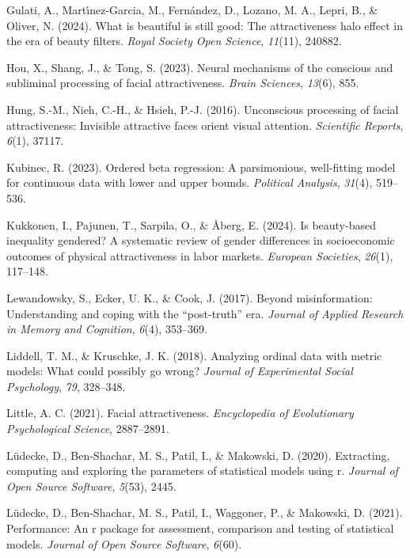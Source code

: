 \documentclass[
  jou,
  floatsintext,
  longtable,
  nolmodern,
  notxfonts,
  notimes,
  colorlinks=true,linkcolor=blue,citecolor=blue,urlcolor=blue]{apa7}
\newlength{\cslhangindent}
\newenvironment{CSLReferences}[2] %
 {\begin{list}{}{%
  \setlength{\itemindent}{0pt}
  \setlength{\leftmargin}{0pt}
  \setlength{\parsep}{0pt}
  \ifodd #1
   \setlength{\leftmargin}{\cslhangindent}
   \setlength{\itemindent}{-1\cslhangindent}
  \fi
  \setlength{\itemsep}{#2\baselineskip}}}
 {\end{list}}
\begin{document}
\begin{CSLReferences}{1}{0}
Gulati, A., Martı́nez-Garcia, M., Fernández, D., Lozano, M. A., Lepri,
B., \& Oliver, N. (2024). What is beautiful is still good: The
attractiveness halo effect in the era of beauty filters. \emph{Royal
Society Open Science}, \emph{11}(11), 240882.

Hou, X., Shang, J., \& Tong, S. (2023). Neural mechanisms of the
conscious and subliminal processing of facial attractiveness.
\emph{Brain Sciences}, \emph{13}(6), 855.

Hung, S.-M., Nieh, C.-H., \& Hsieh, P.-J. (2016). Unconscious processing
of facial attractiveness: Invisible attractive faces orient visual
attention. \emph{Scientific Reports}, \emph{6}(1), 37117.

Kubinec, R. (2023). Ordered beta regression: A parsimonious,
well-fitting model for continuous data with lower and upper bounds.
\emph{Political Analysis}, \emph{31}(4), 519--536.

Kukkonen, I., Pajunen, T., Sarpila, O., \& Åberg, E. (2024). Is
beauty-based inequality gendered? A systematic review of gender
differences in socioeconomic outcomes of physical attractiveness in
labor markets. \emph{European Societies}, \emph{26}(1), 117--148.

Lewandowsky, S., Ecker, U. K., \& Cook, J. (2017). Beyond
misinformation: Understanding and coping with the {``post-truth''} era.
\emph{Journal of Applied Research in Memory and Cognition}, \emph{6}(4),
353--369.

Liddell, T. M., \& Kruschke, J. K. (2018). Analyzing ordinal data with
metric models: What could possibly go wrong? \emph{Journal of
Experimental Social Psychology}, \emph{79}, 328--348.

Little, A. C. (2021). Facial attractiveness. \emph{Encyclopedia of
Evolutionary Psychological Science}, 2887--2891.

Lüdecke, D., Ben-Shachar, M. S., Patil, I., \& Makowski, D. (2020).
Extracting, computing and exploring the parameters of statistical models
using r. \emph{Journal of Open Source Software}, \emph{5}(53), 2445.

Lüdecke, D., Ben-Shachar, M. S., Patil, I., Waggoner, P., \& Makowski,
D. (2021). Performance: An r package for assessment, comparison and
testing of statistical models. \emph{Journal of Open Source Software},
\emph{6}(60).


\end{CSLReferences}
\end{document}
